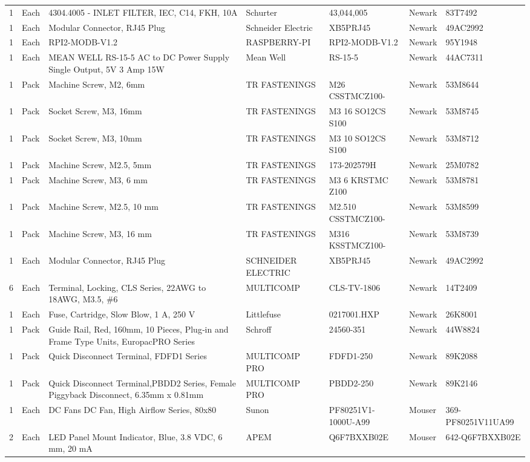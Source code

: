 \documentclass[12pt,a4paper,oneside]{article}
\begin{document}
\begin{landscape}
\begin{table}[H]
{\begin{tabular}{@{}lllllll@{}}
1 & Each & 4304.4005 -  INLET FILTER, IEC, C14, FKH, 10A & Schurter & 43,044,005 & Newark & 83T7492\\
1 & Each & Modular Connector, RJ45 Plug & Schneider Electric & XB5PRJ45 & Newark & 49AC2992\\
1 & Each & RPI2-MODB-V1.2 & RASPBERRY-PI & RPI2-MODB-V1.2 & Newark & 95Y1948\\
1 & Each & MEAN WELL RS-15-5 AC to DC Power Supply Single Output, 5V 3 Amp 15W & Mean Well & RS-15-5 & Newark & 44AC7311\\
1 & Pack & Machine Screw, M2, 6mm & TR FASTENINGS & M26 CSSTMCZ100- & Newark & 53M8644\\
1 & Pack & Socket Screw, M3, 16mm & TR FASTENINGS & M3 16 SO12CS S100 & Newark & 53M8745\\
1 & Pack & Socket Screw, M3, 10mm & TR FASTENINGS & M3 10 SO12CS S100 & Newark & 53M8712\\
1 & Pack & Machine Screw, M2.5, 5mm & TR FASTENINGS & 173-202579H & Newark & 25M0782\\
1 & Pack & Machine Screw, M3, 6 mm & TR FASTENINGS & M3 6 KRSTMC Z100 & Newark & 53M8781\\
1 & Pack & Machine Screw, M2.5, 10 mm & TR FASTENINGS & M2.510 CSSTMCZ100- & Newark & 53M8599\\
1 & Pack & Machine Screw, M3, 16 mm & TR FASTENINGS & M316 KSSTMCZ100- & Newark & 53M8739\\
1 & Each & Modular Connector, RJ45 Plug & SCHNEIDER ELECTRIC & XB5PRJ45 & Newark & 49AC2992\\
6 & Each & Terminal, Locking, CLS Series, 22AWG to 18AWG, M3.5, \#6 & MULTICOMP & CLS-TV-1806 & Newark & 14T2409\\
1 & Each & Fuse, Cartridge, Slow Blow, 1 A, 250 V & Littlefuse & 0217001.HXP & Newark & 26K8001\\
1 & Pack & Guide Rail, Red, 160mm, 10 Pieces, Plug‐in and Frame Type Units, EuropacPRO Series & Schroff & 24560-351 & Newark & 44W8824\\
1 & Pack & Quick Disconnect Terminal, FDFD1 Series & MULTICOMP PRO & FDFD1-250 & Newark & 89K2088\\
1 & Pack & Quick Disconnect Terminal,PBDD2 Series, Female Piggyback Disconnect, 6.35mm x 0.81mm & MULTICOMP PRO & PBDD2-250 & Newark & 89K2146\\
1 & Each & DC Fans DC Fan, High Airflow Series, 80x80 & Sunon & PF80251V1-1000U-A99 & Mouser & 369-PF80251V11UA99\\
2 & Each & LED Panel Mount Indicator, Blue, 3.8 VDC, 6 mm, 20 mA & APEM & Q6F7BXXB02E & Mouser & 642-Q6F7BXXB02E\\

\end{tabular}}
\end{table}
\end{landscape}
\end{document}
